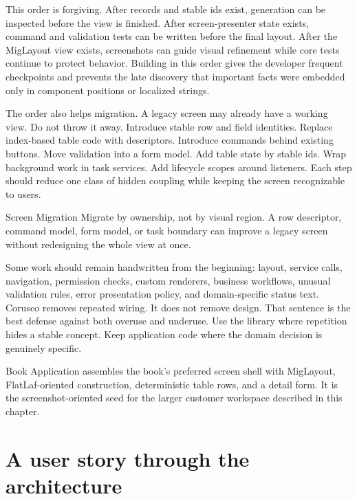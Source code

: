 This order is forgiving. After records and stable ids exist, generation can be
inspected before the view is finished. After screen-presenter state exists, command
and validation tests can be written before the final layout. After the
MigLayout view exists, screenshots can guide visual refinement while core
tests continue to protect behavior. Building in this order gives the developer
frequent checkpoints and prevents the late discovery that important facts were
embedded only in component positions or localized strings.

The order also helps migration. A legacy screen may already have a working
view. Do not throw it away. Introduce stable row and field identities. Replace
index-based table code with descriptors. Introduce commands behind existing
buttons. Move validation into a form model. Add table state by stable ids.
Wrap background work in task services. Add lifecycle scopes around listeners.
Each step should reduce one class of hidden coupling while keeping the screen
recognizable to users.

\begin{migrationbox}{Screen Migration}
Migrate by ownership, not by visual region. A row descriptor, command model,
form model, or task boundary can improve a legacy screen without redesigning
the whole view at once.
\end{migrationbox}

Some work should remain handwritten from the beginning: layout, service calls,
navigation, permission checks, custom renderers, business workflows, unusual
validation rules, error presentation policy, and domain-specific status text.
Corusco removes repeated wiring. It does not remove design. That sentence is
the best defense against both overuse and underuse. Use the library where
repetition hides a stable concept. Keep application code where the domain
decision is genuinely specific.

\begin{examplebox}{Book Application}
\bookAppExample{} assembles the book's preferred screen shell with MigLayout,
FlatLaf-oriented construction, deterministic table rows, and a detail form. It
is the screenshot-oriented seed for the larger customer workspace described in
this chapter.
\end{examplebox}

\section{A user story through the architecture}

